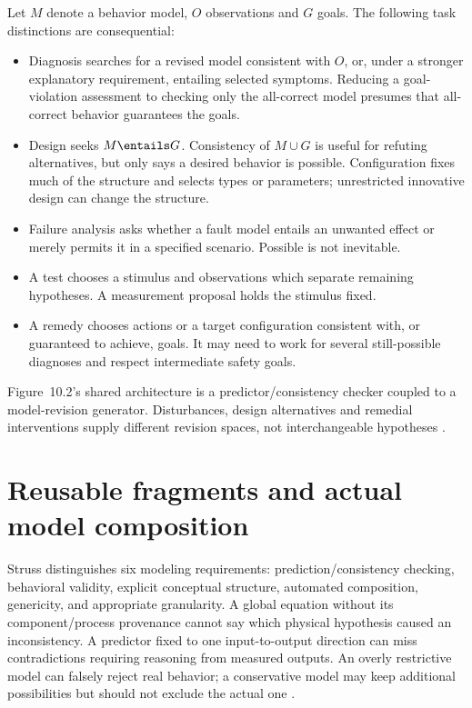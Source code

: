 Let \(M\) denote a behavior model, \(O\) observations and \(G\) goals.
The following task distinctions are consequential:
\begin{itemize}
\item Diagnosis searches for a revised model consistent with \(O\), or,
      under a stronger explanatory requirement, entailing selected symptoms.
      Reducing a goal-violation assessment to checking only the all-correct
      model presumes that all-correct behavior guarantees the goals.
\item Design seeks \(M\entails G\). Consistency of \(M\cup G\) is
      useful for refuting alternatives, but only says a desired behavior is
      possible. Configuration fixes much of the structure and selects types
      or parameters; unrestricted innovative design can change the structure.
\item Failure analysis asks whether a fault model entails an unwanted effect
      or merely permits it in a specified scenario. Possible is not inevitable.
\item A test chooses a stimulus and observations which separate remaining
      hypotheses. A measurement proposal holds the stimulus fixed.
\item A remedy chooses actions or a target configuration consistent with,
      or guaranteed to achieve, goals. It may need to work for several
      still-possible diagnoses and respect intermediate safety goals.
\end{itemize}
Figure~10.2's shared architecture is a predictor/consistency checker coupled
to a model-revision generator. Disturbances, design alternatives and remedial
interventions supply different revision spaces, not interchangeable hypotheses
\cite[sec.~10.2]{Struss2008ModelBasedProblemSolving}.

\section{Reusable fragments and actual model composition}
\label{sec:p16-cm-composition}

Struss distinguishes six modeling requirements: prediction/consistency
checking, behavioral validity, explicit conceptual structure, automated
composition, genericity, and appropriate granularity. A global equation
without its component/process provenance cannot say which physical hypothesis
caused an inconsistency. A predictor fixed to one input-to-output direction
can miss contradictions requiring reasoning from measured outputs.
An overly restrictive model can falsely reject real behavior; a conservative
model may keep additional possibilities but should not exclude the actual one
\cite[secs.~10.3.1--10.3.6]{Struss2008ModelBasedProblemSolving}.

